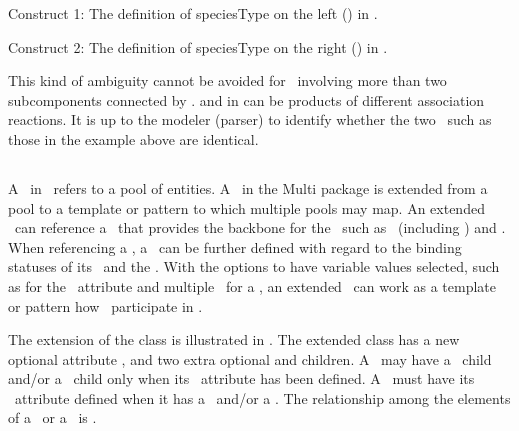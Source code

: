 Construct 1: The definition of speciesType  on the left () in .

Construct 2: The definition of speciesType  on the right () in .

This kind of ambiguity cannot be avoided for \speciesTypes\ involving more than two subcomponents connected by \inSpeciesTypeBonds.  and  in  can be products of different association reactions. It is up to the modeler (parser) to identify whether the two \speciesTypes\ such as those in the example above are identical.

\clearpage

\subsection{}
\label{def:ExSpecies}

A \species\ in \SbmlLevelThreeCore\ refers to a pool of entities. A \species\ in the Multi package is extended from a pool to a template or pattern to which multiple pools may map. An extended \species\ can reference a \speciesType\ that provides the backbone for the \species\ such as \components\ (including \bindingSites) and \speciesFeatureTypes. When referencing a \speciesType, a \species\ can be further defined with regard to the binding statuses of its \outwardBindingSites\ and the \speciesFeatures. With the options to have variable values selected, such as  for the \bindingStatusAtt\ attribute and multiple \possibleSpeciesFeatureValues\ for a \speciesFeature, an extended \species\ can work as a template or pattern how \species\ participate in \reactions.  

The extension of the \Species class is illustrated in . The extended \ExSpecies class has a new optional attribute \speciesTypeAtt, and two extra optional \ListOfOutwardBindingSites and \ListOfSpeciesFeatures children. A \species\ may have a \listOfOutwardBindingSites\ child and/or a \listOfSpeciesFeatures\ child only when its \speciesTypeAtt\ attribute has been defined.  A \species\ must have its \speciesTypeAtt\ attribute defined when it has a \listOfOutwardBindingSites\ and/or a \listOfSpeciesFeatures. The relationship among the elements of a \listOfOutwardBindingSites\ or a \listOfSpeciesFeatures\ is . 

